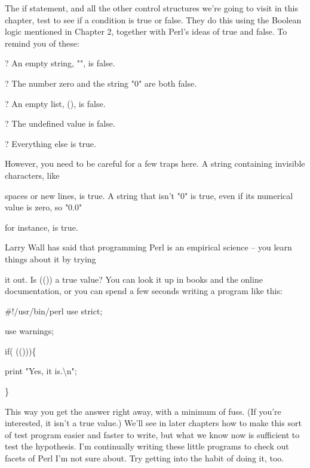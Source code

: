 \documentclass[a4paper,11pt]{book}
\begin{document}
\noindent The if statement, and all the other control structures we're going to visit in this chapter, test to see if a condition is true or false. They do this using the Boolean logic mentioned in Chapter 2, together with Perl's ideas of true and false. To remind you of these:

\noindent 

\noindent ? An empty string, "", is false.

\noindent 

\noindent ? The number zero and the string "0" are both false.

\noindent 

\noindent ? An empty list, (), is false.

\noindent 

\noindent ? The undefined value is false.

\noindent 

\noindent ? Everything else is true.

\noindent 

\noindent 

\noindent However, you need to be careful for a few traps here. A string containing invisible characters, like

\noindent spaces or new lines, is true. A string that isn't "0" is true, even if its numerical value is zero, so "0.0"

\noindent for instance, is true.

\noindent 

\noindent Larry Wall has said that programming Perl is an empirical science -- you learn things about it by trying

\noindent it out. Is (()) a true value? You can look it up in books and the online documentation, or you can spend a few seconds writing a program like this:

\noindent 

\noindent 

\noindent \#!/usr/bin/perl use strict;

\noindent use warnings;

\noindent 

\noindent if( (()))\{ 

\noindent print "Yes, it is.\textbackslash n";

\noindent \}

\noindent 

\noindent This way you get the answer right away, with a minimum of fuss. (If you're interested, it isn't a true value.) We'll see in later chapters how to make this sort of test program easier and faster to write, but what we know now is sufficient to test the hypothesis. I'm continually writing these little programs to check out facets of Perl I'm not sure about. Try getting into the habit of doing it, too.
\end{document}
